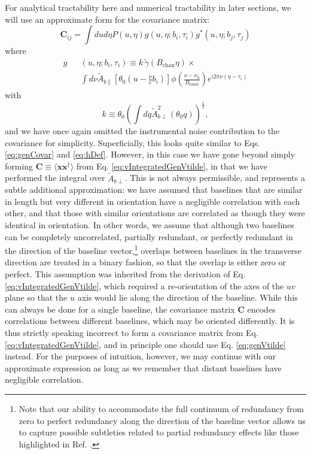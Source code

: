 \documentclass[twocolumn,aps,prd,nofootinbib,showpacs]{revtex4-1}
\begin{document}
For analytical tractability here and numerical tractability in later sections, we will use an approximate form for the covariance matrix:
\begin{equation}
\mathbf{C}_{ij} = \int du d\eta P(u,\eta) g(u, \eta; b_i, \tau_i) g^* (u, \eta; b_j, \tau_j)
\end{equation}
where
\begin{eqnarray}
\label{eq:GeeDef}
g &&(u, \eta; b_i,  \tau_i) \equiv   k \, \widetilde{\gamma}(B_\textrm{chan} \eta) \times \nonumber \\ 
&&  \int d\nu  \widetilde{A}_{b\parallel} \left[ \theta_0 \left( u - \frac{\nu}{c} b_i \right) \right] 
\phi \left( \frac{\nu - \nu_0}{B_\textrm{band}} \right) e^{i 2 \pi \nu (\eta - \tau_i)}
\end{eqnarray}
with
\begin{equation}
k \equiv \theta_0 \left( \int dq \widetilde{A}_{b\perp}^2 (\theta_0 q) \right)^\frac{1}{2},
\end{equation}
and we have once again omitted the instrumental noise contribution to the covariance for simplicity.  Superficially, this looks quite similar to  Eqs. \eqref{eq:genCovar} and \eqref{eq:hDef}.  However, in this case we have gone beyond simply forming $\mathbf{C} \equiv \langle \mathbf{x} \mathbf{x}^\dagger \rangle$ from  Eq. \eqref{eq:vIntegratedGenVtilde}, in that we have performed the integral over $\widetilde{A}_{b\perp}$.  This is not always permissible, and represents a subtle additional approximation: we have assumed that baselines that are similar in length but very different in orientation have a negligible correlation with each other, and that those with similar orientations are correlated as though they were identical in orientation.  In other words, we assume that although two baselines can be completely uncorrelated, partially redundant, or perfectly redundant in the direction of the baseline vector,\footnote{Note that our ability to accommodate the full continuum of redundancy from zero to perfect redundancy along the direction of the baseline vector allows us to capture possible subtleties related to partial redundancy effects like those highlighted in Ref. \cite{Hazelton2013}.} overlaps between baselines in the transverse direction are treated in a binary fashion, so that the overlap is either zero or perfect.  This assumption was inherited from the derivation of  Eq. \eqref{eq:vIntegratedGenVtilde}, which required a re-orientation of the axes of the $uv$ plane so that the $u$ axis would lie along the direction of the baseline.  While this can always be done for a single baseline, the covariance matrix $\mathbf{C}$ encodes correlations between different baselines, which may be oriented differently.  It is thus strictly speaking incorrect to form a covariance matrix from  Eq. \eqref{eq:vIntegratedGenVtilde}, and in principle one should use  Eq. \eqref{eq:genVtilde} instead.  For the purposes of intuition, however, we may continue with our approximate expression as long as we remember that distant baselines have negligible correlation.
\end{document}
